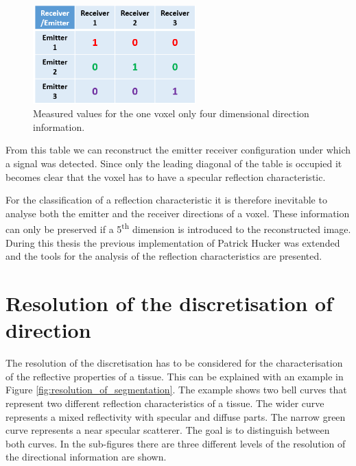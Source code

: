 \begin{figure}[H]
    \centering
    \includegraphics[width=0.56\textwidth]{Graphics/Diskussion/4D_not_enough_table.png}
    \caption{Measured values for the one voxel only four dimensional direction information.}
    \label{table_1}
\end{figure}

From this table we can reconstruct the emitter receiver configuration under which a signal was detected. Since only the leading diagonal of the table is occupied it becomes clear that the voxel has to have a specular reflection characteristic. 

\bigskip


For the classification of a reflection characteristic it is therefore inevitable to analyse both the emitter and the receiver directions of a voxel. These information can only be preserved if a 5\textsuperscript{th} dimension is introduced to the reconstructed image. During this thesis the previous implementation of Patrick Hucker was extended and the tools for the analysis of the reflection characteristics are presented.

\section{Resolution of the discretisation of direction}

The resolution of the discretisation has to be considered for the characterisation of the reflective properties of a tissue. This can be explained with an example in Figure \ref{fig:resolution_of_segmentation}. The example shows two bell curves that represent two different reflection characteristics of a tissue. The wider curve represents a mixed reflectivity with specular and diffuse parts. The narrow green curve represents a near specular scatterer. The goal is to distinguish between both curves. In the sub-figures there are three different levels of the resolution of the directional information are shown.


